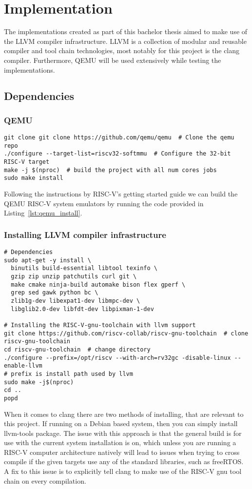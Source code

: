 \section{Implementation}
The implementations created as part of this bachelor thesis aimed
to make use of the LLVM compiler infrastructure.
LLVM is a collection of modular and reusable compiler and tool chain technologies,
most notably for this project is the clang compiler. Furthermore, QEMU will be used extensively while testing the
implementations.

\subsection{Dependencies}
\subsubsection{QEMU}
\begin{lstlisting}[caption=Installing QEMU, float=*, label=lst:qemu_install]
git clone git clone https://github.com/qemu/qemu  # Clone the qemu repo
./configure --target-list=riscv32-softmmu  # Configure the 32-bit RISC-V target
make -j $(nproc)  # build the project with all num cores jobs
sudo make install
\end{lstlisting}
Following the instructions by RISC-V's getting started guide
we can build the QEMU RISC-V system emulators by running the code
provided in Listing~\ref{lst:qemu_install}\cite{RISC-V_GS}.
\subsubsection{Installing LLVM compiler infrastructure}
\begin{lstlisting}[caption=Installing LLVM compiler infastructure with RISC-V
32-bit as native target., float=*, label=lst:llvm_install]
# Dependencies
sudo apt-get -y install \
  binutils build-essential libtool texinfo \
  gzip zip unzip patchutils curl git \
  make cmake ninja-build automake bison flex gperf \
  grep sed gawk python bc \
  zlib1g-dev libexpat1-dev libmpc-dev \
  libglib2.0-dev libfdt-dev libpixman-1-dev

# Installing the RISC-V-gnu-toolchain with llvm support
git clone https://github.com/riscv-collab/riscv-gnu-toolchain  # clone
riscv-gnu-toolchain
cd riscv-gnu-toolchain  # change directory
./configure --prefix=/opt/riscv --with-arch=rv32gc -disable-linux --enable-llvm
# prefix is install path used by llvm
sudo make -j$(nproc)
cd ..
popd
\end{lstlisting}
When it comes to clang there are two methods of installing, that are relevant to
this project. If running on a Debian based system, then you can simply install
llvm-tools package. The issue with this approach is that the general build is
for use with the current system installation is on, which unless you are running
a RISC-V computer architecture natively will lead to issues when trying to cross
compile if the given targets use any of the standard libraries, such as
freeRTOS. A fix to this issue is to explicitly tell clang to make use of the
RISC-V gnu tool chain on every compilation.

